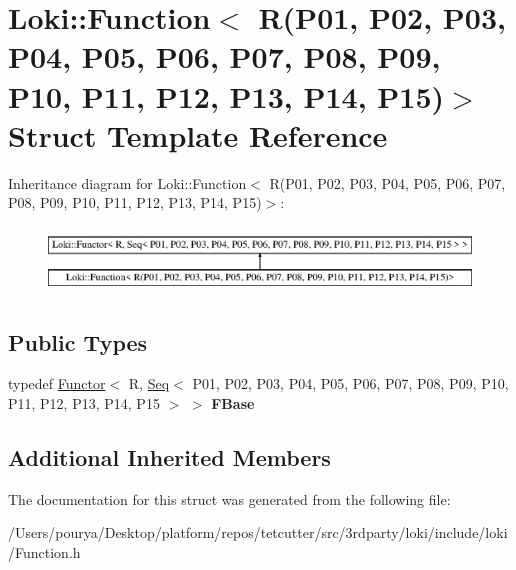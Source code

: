 \hypertarget{structLoki_1_1Function_3_01R_07P01_00_01P02_00_01P03_00_01P04_00_01P05_00_01P06_00_01P07_00_01P0c41dcf0ca70925521bf844f3beedb2ae}{}\section{Loki\+:\+:Function$<$ R(P01, P02, P03, P04, P05, P06, P07, P08, P09, P10, P11, P12, P13, P14, P15)$>$ Struct Template Reference}
\label{structLoki_1_1Function_3_01R_07P01_00_01P02_00_01P03_00_01P04_00_01P05_00_01P06_00_01P07_00_01P0c41dcf0ca70925521bf844f3beedb2ae}
Inheritance diagram for Loki\+:\+:Function$<$ R(P01, P02, P03, P04, P05, P06, P07, P08, P09, P10, P11, P12, P13, P14, P15)$>$\+:\begin{figure}[H]
\begin{center}
\leavevmode
\includegraphics[height=1.763780cm]{structLoki_1_1Function_3_01R_07P01_00_01P02_00_01P03_00_01P04_00_01P05_00_01P06_00_01P07_00_01P0c41dcf0ca70925521bf844f3beedb2ae}
\end{center}
\end{figure}
\subsection*{Public Types}
\begin{DoxyCompactItemize}
\item 
\hypertarget{structLoki_1_1Function_3_01R_07P01_00_01P02_00_01P03_00_01P04_00_01P05_00_01P06_00_01P07_00_01P0c41dcf0ca70925521bf844f3beedb2ae_af5f92b58e4ffe285c5db3973cdf0e102}{}typedef \hyperlink{classLoki_1_1Functor}{Functor}$<$ R, \hyperlink{structLoki_1_1Seq}{Seq}$<$ P01, P02, P03, P04, P05, P06, P07, P08, P09, P10, P11, P12, P13, P14, P15 $>$ $>$ {\bfseries F\+Base}\label{structLoki_1_1Function_3_01R_07P01_00_01P02_00_01P03_00_01P04_00_01P05_00_01P06_00_01P07_00_01P0c41dcf0ca70925521bf844f3beedb2ae_af5f92b58e4ffe285c5db3973cdf0e102}

\end{DoxyCompactItemize}
\subsection*{Additional Inherited Members}


The documentation for this struct was generated from the following file\+:\begin{DoxyCompactItemize}
\item 
/\+Users/pourya/\+Desktop/platform/repos/tetcutter/src/3rdparty/loki/include/loki/Function.\+h\end{DoxyCompactItemize}
